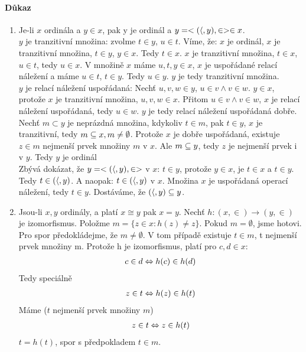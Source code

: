 \documentclass[a4paper,12pt,titlepage]{article}
\begin{document}
\paragraph{Důkaz}
\begin{enumerate}
	\item Je-li $x$ ordinála a $y \in x$, pak y je ordinál a $y =
	<(\langle, y), \in> \in x$. \\
	$y$ je tranzitivní množina: zvolme $t \in y$, $u \in t$.
	Víme, že: $x$ je ordinál, $x$ je tranzitivní množina, $t \in y$, $y \in x$. Tedy
	$t \in x$. $x$ je tranzitivní množina, $t \in x$, $u \in t$, tedy $u \in x$.
	V množině $x$ máme $u, t, y \in x$, $x$ je uspořádané relací náležení a máme $u
	\in t$, $t \in y$. Tedy $u \in y$. $y$ je tedy tranzitivní množina. \\

	$y$ je relací náležení uspořádaná: Nechť $u, v, w \in y$, $ u \in v \land v
	\in w$. $y \in x$, protože $x$ je tranzitivní množina, $u,v,w \in x$. Přitom
	$u \in v \land v \in w$, $x$ je relací náležení uspořádaná, tedy $u \in w$.
	$y$ je tedy relací náležení uspořádaná dobře. Nechť $m \subset y$ je neprázdná
	množina, kdykoliv $t \in m$, pak $t \in y$, $x$ je tranzitivní, tedy $m
	\subseteq x, m \neq \emptyset$. Protože $x$ je dobře uspořádaná, existuje $z
	\in m$ nejmenší prvek množiny $m$ v $x$. Ale $m \subseteq y$, tedy $z$ je
	nejmenší prvek i v $y$. Tedy $y$ je ordinál\\
	Zbývá dokázat, že $y = <(\langle, y), \in>$ v $x$: $t \in y$, protože $y \in x$,
	je $t \in x$ a $t \in y$. Tedy $t \in (\langle, y)$. A naopak: $t \in (\langle, y)$
	v $x$. Množina $x$ je uspořádaná operací náležení, tedy $t \in y$.
	Dostáváme, že $(\langle, y) \subseteq y$.

	\item Jsou-li $x, y$ ordinály, a platí $x \cong y$ pak $x = y$. Nechť $h: (x,
	\in) \to (y, \in)$ je izomorfismus. Položme $m = \{ z \in x: h(z) \neq z \}$.
	Pokud $m = \emptyset$, jsme hotovi. Pro spor předokládejme, že $m \neq
	\emptyset$. V tom případě existuje $t \in m$, t nejmenší prvek množiny m.
	Protože h je izomorfismus, platí pro $c,d \in x$:
	\begin{align}
		c \in d \Leftrightarrow h(c) \in h(d)
	\end{align}
	Tedy speciálně
	\begin{align}
		z \in t \Leftrightarrow h(z) \in h(t)
	\end{align}
	Máme ($t$ nejmenší prvek množiny $m$)
	\begin{align}
		z \in t \Leftrightarrow z \in h(t)
	\end{align}
	$t = h(t)$, spor s předpokladem $t \in m$.


\end{enumerate}
\end{document}
